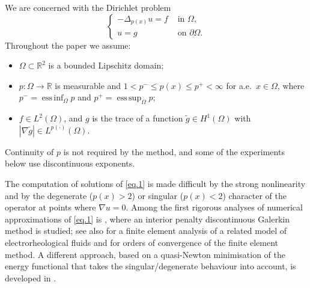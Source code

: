 \documentclass[11pt]{amsart}
\newcommand{\R}{\mathbb R}
\newcommand{\pp}{p(\cdot)}
\theoremstyle{definition}
\theoremstyle{remark}
\numberwithin{equation}{section}
\begin{document}
We are concerned with the Dirichlet problem
\begin{equation}\label{eq.1}
\begin{cases}
-\Delta_{p(x)} u = f & \text{ in }\Omega,\\
u=g & \text{ on }\partial\Omega.
\end{cases}
\end{equation}
Throughout the paper we assume:
\begin{itemize}
\item[(A1)] $\Omega\subset\R^2$ is a bounded Lipschitz domain;
\item[(A2)] $p\colon\Omega\to\R$ is measurable and $1<p^-\le p(x)\le p^+<\infty$ for a.e.\ $x\in\Omega$, where $p^-=\operatorname{ess\,inf}_\Omega p$ and $p^+=\operatorname{ess\,sup}_\Omega p$;
\item[(A3)] $f\in L^2(\Omega)$, and $g$ is the trace of a function $\tilde g\in H^1(\Omega)$ with $|\nabla \tilde g|\in L^{\pp}(\Omega)$.
\end{itemize}
Continuity of $p$ is not required by the method, and some of the experiments below use discontinuous exponents.

The computation of solutions of \eqref{eq.1} is made difficult by the strong nonlinearity and by the degenerate ($p(x)>2$) or singular ($p(x)<2$) character of the operator at points where $\nabla u=0$. Among the first rigorous analyses of numerical approximations of \eqref{eq.1} is \cite{DPLM}, where an interior penalty discontinuous Galerkin method is studied; see also \cite{D} for a finite element analysis of a related model of electrorheological fluids and \cite{DPM2} for orders of convergence of the finite element method. A different approach, based on a quasi-Newton minimisation of the energy functional that takes the singular/degenerate behaviour into account, is developed in \cite{CZ}.
\end{document}
